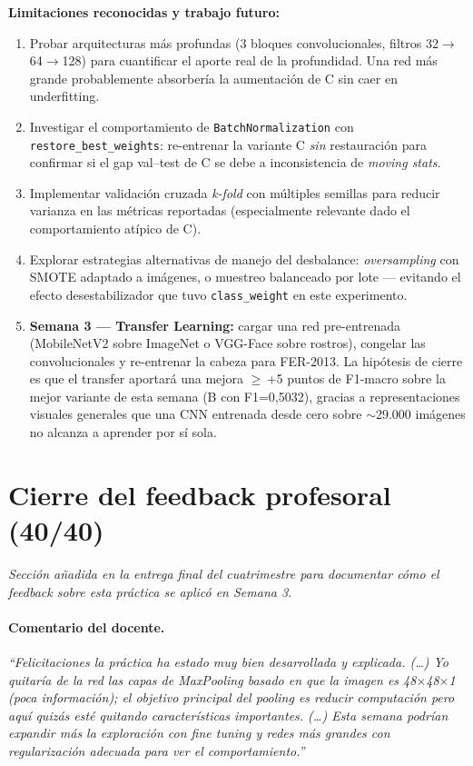 \documentclass[10pt,a4paper,twocolumn]{article}
\begin{document}
\textbf{Limitaciones reconocidas y trabajo futuro:}
\begin{enumerate}[label=\roman*.]
    \item Probar arquitecturas más profundas (3 bloques convolucionales, filtros 32$\rightarrow$64$\rightarrow$128) para cuantificar el aporte real de la profundidad. Una red más grande probablemente absorbería la aumentación de C sin caer en underfitting.
    \item Investigar el comportamiento de \texttt{BatchNormalization} con \texttt{restore\_best\_weights}: re-entrenar la variante C \textit{sin} restauración para confirmar si el gap val--test de C se debe a inconsistencia de \textit{moving stats}.
    \item Implementar validación cruzada \textit{k-fold} con múltiples semillas para reducir varianza en las métricas reportadas (especialmente relevante dado el comportamiento atípico de C).
    \item Explorar estrategias alternativas de manejo del desbalance: \textit{oversampling} con SMOTE adaptado a imágenes, o muestreo balanceado por lote --- evitando el efecto desestabilizador que tuvo \texttt{class\_weight} en este experimento.
    \item \textbf{Semana 3 --- Transfer Learning:} cargar una red pre-entrenada (MobileNetV2 sobre ImageNet o VGG-Face sobre rostros), congelar las convolucionales y re-entrenar la cabeza para FER-2013. La hipótesis de cierre es que el transfer aportará una mejora $\geq$\,+5 puntos de F1-macro sobre la mejor variante de esta semana (B con F1=0,5032), gracias a representaciones visuales generales que una CNN entrenada desde cero sobre $\sim$29.000 imágenes no alcanza a aprender por sí sola.
\end{enumerate}

\section{Cierre del feedback profesoral (40/40)}

\textit{Sección añadida en la entrega final del cuatrimestre para documentar cómo el feedback sobre esta práctica se aplicó en Semana 3.}

\paragraph{Comentario del docente.} \textit{``Felicitaciones la práctica ha estado muy bien desarrollada y explicada. (\ldots) Yo quitaría de la red las capas de MaxPooling basado en que la imagen es 48$\times$48$\times$1 (poca información); el objetivo principal del pooling es reducir computación pero aquí quizás esté quitando características importantes. (\ldots) Esta semana podrían expandir más la exploración con fine tuning y redes más grandes con regularización adecuada para ver el comportamiento.''}
\end{document}
